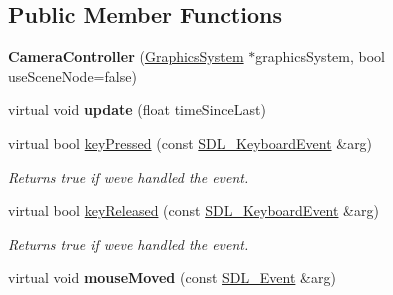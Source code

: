 \subsection*{Public Member Functions}
\begin{DoxyCompactItemize}
\item 
\mbox{\label{class_common_1_1_camera_controller_a09c9f866ac2161de31ff45694dd711fd}} 
{\bfseries Camera\+Controller} (\hyperlink{class_common_1_1_graphics_system}{Graphics\+System} $\ast$graphics\+System, bool use\+Scene\+Node=false)
\item 
\mbox{\label{class_common_1_1_camera_controller_a5d11cbced7f78eec997b96bb489d0806}} 
virtual void {\bfseries update} (float time\+Since\+Last)
\item 
\mbox{\label{class_common_1_1_camera_controller_aefb0839a3f45e4390c764762b7a053a1}} 
virtual bool \hyperlink{class_common_1_1_camera_controller_aefb0839a3f45e4390c764762b7a053a1}{key\+Pressed} (const \hyperlink{struct_s_d_l___keyboard_event}{S\+D\+L\+\_\+\+Keyboard\+Event} \&arg)
\begin{DoxyCompactList}\small\item\em Returns true if we\textquotesingle{}ve handled the event. \end{DoxyCompactList}\item 
\mbox{\label{class_common_1_1_camera_controller_a2ade17644b5c6a9249b6fcff6c358b2e}} 
virtual bool \hyperlink{class_common_1_1_camera_controller_a2ade17644b5c6a9249b6fcff6c358b2e}{key\+Released} (const \hyperlink{struct_s_d_l___keyboard_event}{S\+D\+L\+\_\+\+Keyboard\+Event} \&arg)
\begin{DoxyCompactList}\small\item\em Returns true if we\textquotesingle{}ve handled the event. \end{DoxyCompactList}\item 
\mbox{\label{class_common_1_1_camera_controller_af56a45fb24b5c2e5603210be8377aa8d}} 
virtual void {\bfseries mouse\+Moved} (const \hyperlink{union_s_d_l___event}{S\+D\+L\+\_\+\+Event} \&arg)
\end{DoxyCompactItemize}
